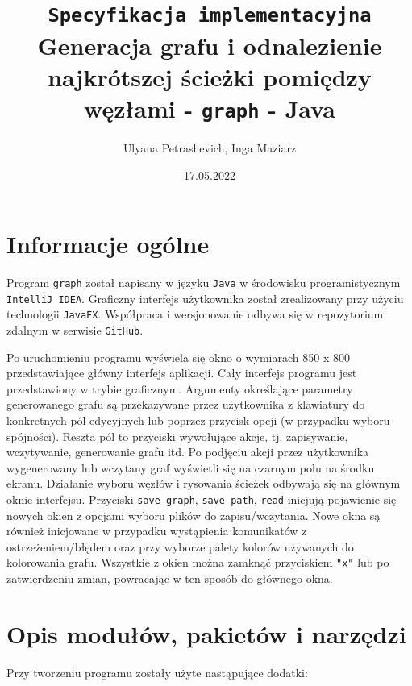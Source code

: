 \documentclass[]{article}
\title{\texttt{Specyfikacja implementacyjna}\\Generacja grafu i odnalezienie najkrótszej ścieżki pomiędzy węzłami - \texttt{graph} - Java}
\author{Ulyana Petrashevich, Inga Maziarz}
\date{17.05.2022}
\begin{document}
\maketitle
\tableofcontents
\thispagestyle{empty}
\newpage
\section{Informacje ogólne}\label{header-n231}
Program \texttt{graph} został napisany w języku \texttt{Java} w środowisku programistycznym \texttt{IntelliJ IDEA}. Graficzny interfejs użytkownika został zrealizowany przy użyciu technologii \texttt{JavaFX}. Współpraca i wersjonowanie odbywa się w repozytorium zdalnym w serwisie \texttt{GitHub}.

Po uruchomieniu programu wyświela się okno o wymiarach 850 x 800 przedstawiające główny interfejs aplikacji. Cały interfejs programu jest przedstawiony w trybie graficznym. Argumenty określające parametry generowanego grafu są przekazywane przez użytkownika z klawiatury do konkretnych pól edycyjnych lub poprzez przycisk opcji (w przypadku wyboru spójności). Reszta pól to przyciski wywołujące akcje, tj. zapisywanie, wczytywanie, generowanie grafu itd. Po podjęciu akcji przez użytkownika wygenerowany lub wczytany graf wyświetli się na czarnym polu na środku ekranu. Działanie wyboru węzłów i rysowania ścieżek odbywają się na głównym oknie interfejsu. Przyciski \texttt{save graph}, \texttt{save path}, \texttt{read} inicjują pojawienie się nowych okien z opcjami wyboru plików do zapisu/wczytania. Nowe okna są również inicjowane w przypadku wystąpienia komunikatów z ostrzeżeniem/błędem oraz przy wyborze palety kolorów używanych do kolorowania grafu. Wszystkie z okien można zamknąć przyciskiem \texttt{"x"} lub po zatwierdzeniu zmian, powracając w ten sposób do głównego okna.

\section{Opis modułów, pakietów i narzędzi}\label{header-n233}
Przy tworzeniu programu zostały użyte nastąpujące dodatki:
\end{document}
